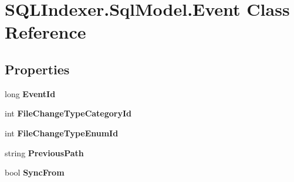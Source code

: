 \hypertarget{class_s_q_l_indexer_1_1_sql_model_1_1_event}{\section{S\-Q\-L\-Indexer.\-Sql\-Model.\-Event Class Reference}
\label{class_s_q_l_indexer_1_1_sql_model_1_1_event}
}
\subsection*{Properties}
\begin{DoxyCompactItemize}
\item 
\hypertarget{class_s_q_l_indexer_1_1_sql_model_1_1_event_add3652aa5d59e3237056b0351320e05b}{long {\bfseries Event\-Id}}\label{class_s_q_l_indexer_1_1_sql_model_1_1_event_add3652aa5d59e3237056b0351320e05b}

\item 
\hypertarget{class_s_q_l_indexer_1_1_sql_model_1_1_event_a00e602d5a1abcfc87c2c1822311bf8c6}{int {\bfseries File\-Change\-Type\-Category\-Id}}\label{class_s_q_l_indexer_1_1_sql_model_1_1_event_a00e602d5a1abcfc87c2c1822311bf8c6}

\item 
\hypertarget{class_s_q_l_indexer_1_1_sql_model_1_1_event_a830c35d01eb9e0a8a152e9c8f48fa441}{int {\bfseries File\-Change\-Type\-Enum\-Id}}\label{class_s_q_l_indexer_1_1_sql_model_1_1_event_a830c35d01eb9e0a8a152e9c8f48fa441}

\item 
\hypertarget{class_s_q_l_indexer_1_1_sql_model_1_1_event_ad3cdf42fab17f7863eb118c256391619}{string {\bfseries Previous\-Path}}\label{class_s_q_l_indexer_1_1_sql_model_1_1_event_ad3cdf42fab17f7863eb118c256391619}

\item 
\hypertarget{class_s_q_l_indexer_1_1_sql_model_1_1_event_a591750f92a59b80d710fa6a48d717251}{bool {\bfseries Sync\-From}}\label{class_s_q_l_indexer_1_1_sql_model_1_1_event_a591750f92a59b80d710fa6a48d717251}


\end{DoxyCompactItemize}

